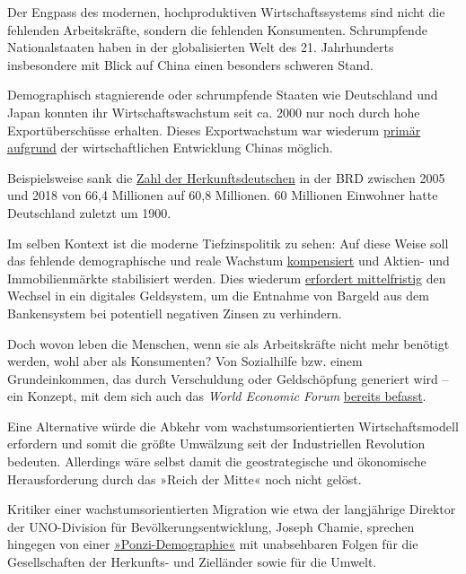 Der Engpass des modernen, hochproduktiven Wirtschaftssystems sind nicht
die fehlenden Arbeits­kräfte, sondern die fehlenden Konsumenten.
Schrumpfende Nationalstaaten haben in der globali­sierten Welt des 21.
Jahrhunderts insbesondere mit Blick auf China einen besonders schweren
Stand.

Demographisch stagnierende oder schrumpfende Staaten wie Deutschland und
Japan konnten ihr Wirtschaftswachstum seit ca. 2000 nur noch durch hohe
Exportüberschüsse erhalten. Dieses Export­wachstum war wiederum
\href{https://www.zeit.de/wirtschaft/2017-02/china-deutschland-handel-exporte-import-statistisches-bundesamt}{primär
aufgrund} der wirtschaftlichen Entwicklung Chinas möglich.

Beispielsweise sank die
\href{https://www.welt.de/politik/deutschland/article198942039/Selbst-bei-Nullzuwanderung-wuerde-der-Migrationsanteil-steigen.html}{Zahl
der Herkunftsdeutschen} in der BRD zwischen 2005 und 2018 von 66,4
Millionen auf 60,8 Millionen. 60 Millionen Einwohner hatte Deutschland
zuletzt um 1900.

Im selben Kontext ist die moderne Tiefzinspolitik zu sehen: Auf diese
Weise soll das fehlende demographische und reale Wachstum
\href{https://econimica.blogspot.com/2018/12/a-debt-based-system-cant-succeed.html}{kompensiert}
und Aktien- und Immobilienmärkte stabilisiert werden. Dies wiederum
\href{https://www.businessinsider.de/warum-banken-das-bargeld-wirklich-abschaffen-wollen-2016-10}{erfordert
mittelfristig} den Wechsel in ein digitales Geldsystem, um die Ent­nahme
von Bargeld aus dem Bankensystem bei potentiell negativen Zinsen zu
verhindern.

Doch wovon leben die Menschen, wenn sie als Arbeitskräfte nicht mehr
benötigt werden, wohl aber als Konsumenten? Von Sozialhilfe bzw. einem
Grundeinkommen, das durch Verschuldung oder Geld­schö­p­fung generiert
wird -- ein Konzept, mit dem sich auch das \emph{World Economic Forum}
\href{https://theconversation.com/how-basic-income-can-solve-one-of-the-digital-economys-biggest-problems-53081}{bereits
befasst}.

Eine Alternative würde die Abkehr vom wachstumsorientierten
Wirtschaftsmodell erfordern und so­mit die größte Umwälzung seit der
Industriellen Revolution bedeuten. Allerdings wäre selbst damit die
geostrategische und ökonomische Herausforderung durch das »Reich der
Mitte« noch nicht gelöst.

Kritiker einer wachstumsorientierten Migration wie etwa der langjährige
Direktor der UNO-Division für Be­völ­ke­rungs­entwicklung, Joseph
Chamie, sprechen hingegen von einer
\href{https://www.theglobalist.com/is-population-growth-a-ponzi-scheme/}{»Ponzi-Demographie«}
mit unabsehbaren Folgen für die Gesellschaften der Herkunfts- und
Zielländer sowie für die Umwelt.

